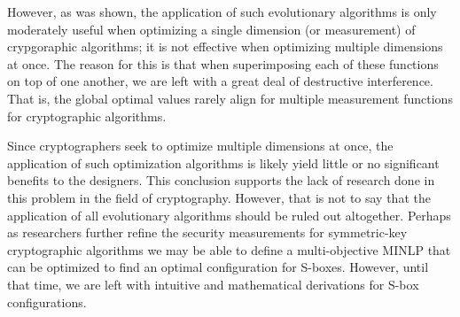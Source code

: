 \documentclass[11pt]{article}
\begin{document}
However, as was shown, the application of such evolutionary algorithms is only moderately useful when optimizing a single dimension (or measurement) of crypgoraphic algorithms; it is not effective when optimizing multiple dimensions at once. The reason for this is that when superimposing each of these functions on top of one another, we are left with a great deal of destructive interference. That is, the global optimal values rarely align for multiple measurement functions for cryptographic algorithms. 

Since cryptographers seek to optimize multiple dimensions at once, the application of such optimization algorithms is likely yield little or no significant benefits to the designers. This conclusion supports the lack of research done in this problem in the field of cryptography. However, that is not to say that the application of all evolutionary algorithms should be ruled out altogether. Perhaps as researchers further refine the security measurements for symmetric-key cryptographic algorithms we may be able to define a multi-objective MINLP that can be optimized to find an optimal configuration for S-boxes. However, until that time, we are left with intuitive and mathematical derivations for S-box configurations.



\end{document}

